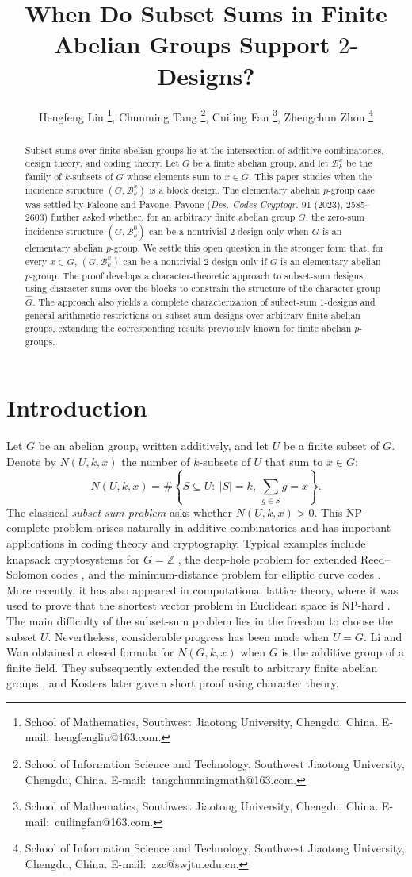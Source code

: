 \documentclass[11pt]{article}
\title{When Do Subset Sums in Finite Abelian Groups Support $2$-Designs?}
\author{
	Hengfeng Liu%
	\thanks{\raggedright School of Mathematics, Southwest Jiaotong University, Chengdu, China.
		\mbox{E-mail: hengfengliu@163.com.}},
	\quad
	Chunming Tang%
	\thanks{\raggedright School of Information Science and Technology,
		Southwest Jiaotong University, Chengdu, China. 
		\mbox{E-mail: tangchunmingmath@163.com.}},
	\quad
	Cuiling Fan%
	\thanks{\raggedright School of Mathematics, Southwest Jiaotong University, Chengdu, China.
		\mbox{E-mail: cuilingfan@163.com.}},
	\quad
	Zhengchun Zhou%
	\thanks{\raggedright School of Information Science and Technology,
		Southwest Jiaotong University, Chengdu, China. \mbox{E-mail: zzc@swjtu.edu.cn.}}
}
\date{}
\theoremstyle{definition}
\newcommand{\cB}{\mathcal B}
\begin{document}
\maketitle



\begin{abstract}
	Subset sums over finite abelian groups lie at the intersection of
	additive combinatorics, design theory, and coding theory. Let $G$ be a finite abelian group, and let $\cB_k^x$ be the family of $k$-subsets of $G$ whose elements sum to $x\in G$. This paper studies when the incidence structure $(G,\cB_k^x)$ is a block design. The elementary abelian $p$-group case was settled by Falcone and Pavone. Pavone (\emph{Des. Codes Cryptogr.} 91 (2023), 2585--2603) further asked whether, for an arbitrary finite abelian group $G$, the zero-sum incidence structure $(G,\cB_k^0)$ can be a nontrivial $2$-design only when $G$ is an elementary abelian $p$-group. We settle this open question in the stronger form that, for every $x\in G$, $(G,\cB_k^x)$ can be a nontrivial $2$-design only if $G$ is an elementary abelian $p$-group. The proof develops a character-theoretic approach to subset-sum designs, using character sums over the blocks to constrain the structure of the character group $\widehat G$. The approach also yields a complete characterization of subset-sum $1$-designs and general arithmetic restrictions on subset-sum designs over arbitrary finite abelian groups, extending the corresponding results previously known for finite abelian $p$-groups.
\end{abstract}


\section{Introduction}

Let $G$ be an abelian group, written additively, and let $U$ be a finite subset of $G$. Denote by $N(U,k,x)$ the number of $k$-subsets of $U$ that sum to $x\in G$:
\[
N(U,k,x)
=
\#\left\{
S\subseteq U:\ |S|=k,\ \sum_{g\in S}g=x
\right\}.
\]
The classical \emph{subset-sum problem} asks whether $N(U,k,x)>0$. This NP-complete problem \cite{Karp1972} arises naturally in additive combinatorics and has important applications in coding theory and cryptography. Typical examples include knapsack cryptosystems for $G=\mathbb Z$ \cite{MerkleHellman1978}, the deep-hole problem for extended Reed--Solomon codes \cite{Cheng2008,ZhangWanKaipa2020,ZhangWan2023}, and the minimum-distance problem for elliptic curve codes \cite{LiWanZhang2015,ZhangWan2023}. More recently, it has also appeared in computational lattice theory, where it was used to prove that the shortest vector problem in Euclidean space is NP-hard \cite{Wan2026}. The main difficulty of the subset-sum problem lies in the freedom to choose the subset $U$. Nevertheless, considerable progress has been made when $U=G$. Li and Wan \cite{LiWan2008} obtained a closed formula for $N(G,k,x)$ when $G$ is the additive group of a finite field. They subsequently extended the result to arbitrary finite abelian groups \cite{LiWan2012}, and Kosters \cite{Kosters2013} later gave a short proof using character theory.
\end{document}
